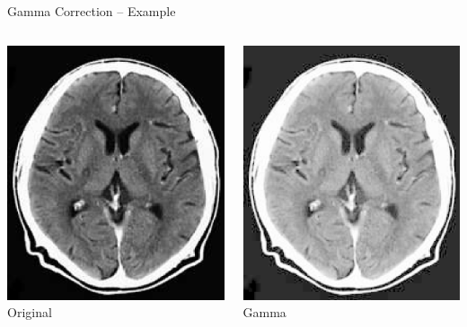 \begin{frame}[c]{Gamma Correction -- Example}
\begin{columns}[onlytextwidth]
\begin{column}{0.30\textwidth}
            \includegraphics[width=\textwidth]{img/brain}\\ Original
        \end{column}
        \begin{column}{0.30\textwidth}\centering
            \includegraphics[width=\textwidth]{img/brain_gamma1}\\ Gamma

\end{column}
\end{columns}
\end{frame}
